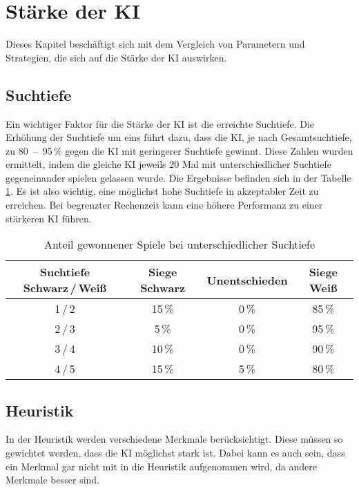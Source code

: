 \section{Stärke der KI}
Dieses Kapitel beschäftigt sich mit dem Vergleich von Parametern und Strategien, die sich auf die Stärke der KI auswirken.

\subsection{Suchtiefe}
Ein wichtiger Faktor für die Stärke der KI ist die erreichte Suchtiefe.
Die Erhöhung der Suchtiefe um eins führt dazu, dass die KI, je nach Gesamtsuchtiefe, zu 80~–~95\,\% gegen die KI mit geringerer Suchtiefe gewinnt.
Diese Zahlen wurden ermittelt, indem die gleiche KI jeweils 20 Mal mit unterschiedlicher Suchtiefe gegeneinander spielen gelassen wurde.
Die Ergebnisse befinden sich in der Tabelle \ref{table:search-depth}.
Es ist also wichtig, eine möglichst hohe Suchtiefe in akzeptabler Zeit zu erreichen.
Bei begrenzter Rechenzeit kann eine höhere Performanz zu einer stärkeren KI führen.

\begin{table}[hb]
    \centering
    \begin{tabular}{c|ccc}
    \hline
    Suchtiefe Schwarz\,/\,Weiß & Siege Schwarz & Unentschieden & Siege Weiß \\ \hline
    1\,/\,2  & 15\,\% &  0\,\% & 85\,\% \\
    2\,/\,3  &  5\,\% &  0\,\% & 95\,\% \\
    3\,/\,4  & 10\,\% &  0\,\% & 90\,\% \\
    4\,/\,5  & 15\,\% &  5\,\% & 80\,\% \\
    \hline
    \end{tabular}
    \caption{Anteil gewonnener Spiele bei unterschiedlicher Suchtiefe}
    \label{table:search-depth}
\end{table}

\subsection{Heuristik}
In der Heuristik werden verschiedene Merkmale berücksichtigt. Diese müssen so gewichtet werden, dass die KI möglichst
stark ist. Dabei kann es auch sein, dass ein Merkmal gar nicht mit in die Heuristik aufgenommen wird, da andere Merkmale
besser sind.

